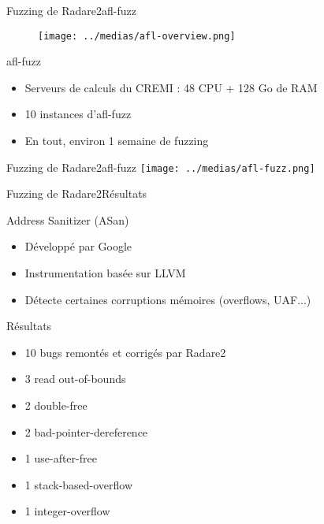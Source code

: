 \begin{frame}{Fuzzing de Radare2}{afl-fuzz}
  \begin{figure}
    \texttt{[image: ../medias/afl-overview.png]}
  \end{figure}

  \pause

  \begin{exampleblock}{afl-fuzz}
    \begin{itemize}
    \item{Serveurs de calculs du CREMI : 48 CPU + 128 Go de RAM}
    \item{10 instances d'afl-fuzz}
    \item{En tout, environ 1 semaine de fuzzing}
    \end{itemize}
  \end{exampleblock}

\end{frame}

\begin{frame}{Fuzzing de Radare2}{afl-fuzz}
  \texttt{[image: ../medias/afl-fuzz.png]}
\end{frame}

\begin{frame}{Fuzzing de Radare2}{Résultats}
  \begin{exampleblock}{Address Sanitizer (ASan)}
    \begin{itemize}
    \item{Développé par Google}
    \item{Instrumentation basée sur LLVM}
    \item{Détecte certaines corruptions mémoires (overflows, UAF...)}
    \end{itemize}
  \end{exampleblock}

  \pause

  \begin{block}{Résultats}
    \begin{itemize}
    \item{10 bugs remontés et corrigés par Radare2}
    \item{3 read out-of-bounds}
    \item{2 double-free}
    \item{2 bad-pointer-dereference}
    \item{1 use-after-free}
    \item{1 stack-based-overflow}
    \item{1 integer-overflow}
    \end{itemize}
  \end{block}
\end{frame}
